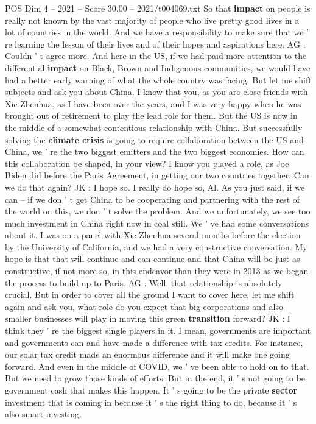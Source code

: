 \begin{textsample}{POS Dim 4 – 2021 – Score 30.00 – 2021/t004069.txt}
So that \textbf{impact} on people is really not known by the vast majority of people who live pretty good lives in a lot of countries in the world.
And we have a responsibility to make sure that we ' re learning the lesson of their lives and of their hopes and aspirations here.
AG : Couldn ' t agree more.
And here in the US, if we had paid more attention to the differential \textbf{impact} on Black, Brown and Indigenous communities, we would have had a better early warning of what the whole country was facing.
But let me shift subjects and ask you about China.
I know that you, as you are close friends with Xie Zhenhua, as I have been over the years, and I was very happy when he was brought out of retirement to play the lead role for them.
But the US is now in the middle of a somewhat contentious relationship with China.
But successfully solving the \textbf{climate} \textbf{crisis} is going to require collaboration between the US and China, we ' re the two biggest emitters and the two biggest economies.
How can this collaboration be shaped, in your view?
I know you played a role, as Joe Biden did before the Paris Agreement, in getting our two countries together.
Can we do that again?
JK : I hope so.
I really do hope so, Al.
As you just said, if we can -- if we don ' t get China to be cooperating and partnering with the rest of the world on this, we don ' t solve the problem.
And we unfortunately, we see too much investment in China right now in coal still.
We ' ve had some conversations about it.
I was on a panel with Xie Zhenhua several months before the election by the University of California, and we had a very constructive conversation.
My hope is that that will continue and can continue and that China will be just as constructive, if not more so, in this endeavor than they were in 2013 as we began the process to build up to Paris.
AG : Well, that relationship is absolutely crucial.
But in order to cover all the ground I want to cover here, let me shift again and ask you, what role do you expect that big corporations and also smaller businesses will play in moving this green \textbf{transition} forward?
JK : I think they ' re the biggest single players in it.
I mean, governments are important and governments can and have made a difference with tax credits.
For instance, our solar tax credit made an enormous difference and it will make one going forward.
And even in the middle of COVID, we ' ve been able to hold on to that.
But we need to grow those kinds of efforts.
But in the end, it ' s not going to be government cash that makes this happen.
It ' s going to be the private \textbf{sector} investment that is coming in because it ' s the right thing to do, because it ' s also smart investing.

\end{textsample}
